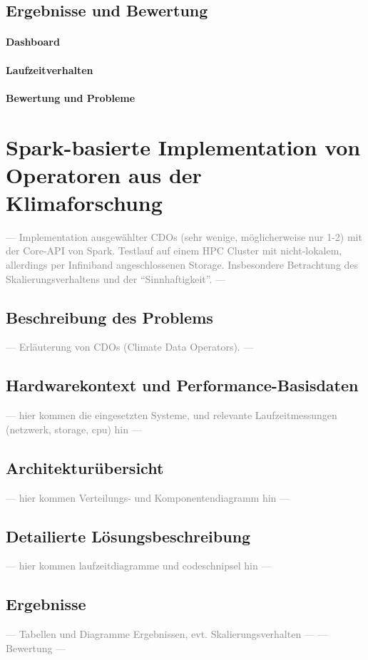 \subsection{Ergebnisse und Bewertung}
\paragraph{Dashboard}
\paragraph{Laufzeitverhalten}
\paragraph{Bewertung und Probleme}


\section{Spark-basierte Implementation von Operatoren aus der Klimaforschung}
\textcolor{gray}{--- Implementation ausgewählter CDOs (sehr wenige, möglicherweise nur 1-2) mit der Core-API von Spark. Testlauf auf einem HPC Cluster mit nicht-lokalem, allerdings per Infiniband angeschlossenen Storage.
Insbesondere Betrachtung des Skalierungsverhaltens und der "`Sinnhaftigkeit"'. ---}

\subsection{Beschreibung des Problems}
\textcolor{gray}{--- Erläuterung von CDOs (Climate Data Operators). ---}
\subsection{Hardwarekontext und Performance-Basisdaten}
\textcolor{gray}{--- hier kommen die eingesetzten Systeme, und relevante Laufzeitmessungen (netzwerk, storage, cpu) hin ---}
\subsection{Architekturübersicht}
\textcolor{gray}{--- hier kommen Verteilungs- und Komponentendiagramm hin ---}
\subsection{Detailierte Lösungsbeschreibung}
\textcolor{gray}{--- hier kommen laufzeitdiagramme und codeschnipsel hin ---}
\subsection{Ergebnisse}
\textcolor{gray}{--- Tabellen und Diagramme Ergebnissen, evt. Skalierungsverhalten ---}
\textcolor{gray}{--- Bewertung ---}
